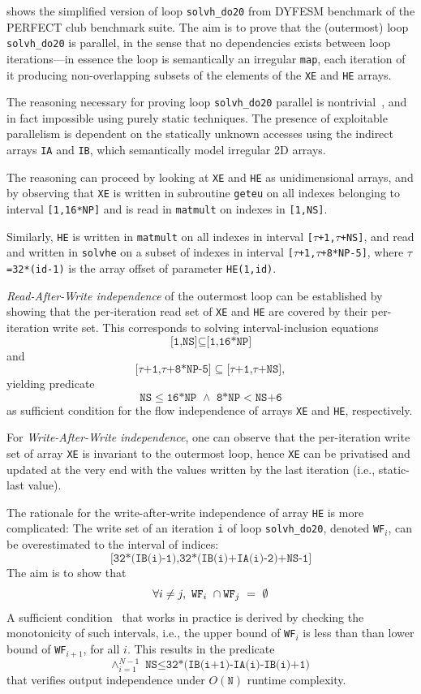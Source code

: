  shows the simplified version of loop
\texttt{solvh\_do20} from DYFESM benchmark of the PERFECT club
benchmark suite.
%
The aim is to prove that the (outermost) loop \texttt{solvh\_do20} is
parallel, in the sense that no dependencies exists between loop
iterations---in essence the loop is semantically an irregular
\texttt{map}, each iteration of it producing non-overlapping subsets
of the elements of the \texttt{XE} and \texttt{HE} arrays.

The reasoning necessary for proving loop \texttt{solvh\_do20} parallel
is nontrivial~\cite{CosPLDI}, and in fact impossible using purely
static techniques.  The presence of exploitable parallelism is
dependent on the statically unknown accesses using the indirect arrays
\texttt{IA} and \texttt{IB}, which semantically model irregular 2D
arrays.

The reasoning can proceed by looking at \texttt{XE} and \texttt{HE} as
unidimensional arrays, and by observing that \texttt{XE} is written in
subroutine \texttt{geteu} on all indexes belonging to interval
\texttt{[1,16*NP]} and is read in \texttt{matmult} on indexes in
\texttt{[1,NS]}.

Similarly, \texttt{HE} is written in \texttt{matmult} on all indexes in interval
\texttt{[$\tau$+1,$\tau$+NS]}, and read and written in \texttt{solvhe} on a subset
of indexes in interval \texttt{[$\tau$+1,$\tau$+8*NP-5]}, where
$\tau$\texttt{=32*(id-1)} is the array offset of parameter \texttt{HE(1,id)}.

\textit{Read-After-Write independence} of the outermost loop can be
established by showing that the per-iteration read set of \texttt{XE}
and \texttt{HE} are covered by their per-iteration write set. This
corresponds to solving interval-inclusion equations
\[
  \texttt{[1,NS]$\subseteq$[1,16*NP]}
\]
and
\[
  \texttt{[$\tau$+1,$\tau$+8*NP-5]$\subseteq$[$\tau$+1,$\tau$+NS]},
\]
yielding predicate
\[
  \texttt{NS$\leq$16*NP $\wedge$ 8*NP$<$NS+6}
\]
as sufficient condition for the flow independence of arrays
\texttt{XE} and \texttt{HE}, respectively.

For \textit{Write-After-Write independence}, one can observe that the
per-iteration write set of array \texttt{XE} is invariant to the
outermost loop, hence \texttt{XE} can be privatised and updated at the
very end with the values written by the last iteration (i.e.,
static-last value).

The rationale for the write-after-write independence of array
\texttt{HE} is more complicated: The write set of an iteration
\texttt{i} of loop \texttt{solvh\_do20},
denoted \texttt{WF$_i$}, can be overestimated to the interval of indices:
\[
  \texttt{[32*(IB(i)-1),32*(IB(i)+IA(i)-2)+NS-1]}
  \]
  The aim is to show that
  \[
    \forall i \neq j, \ \mbox{\texttt{WF}}_i \ \cap
    \mbox{\texttt{WF}}_j \ = \ \emptyset
\]
A sufficient condition~\cite{OanceaMon} that works in practice is
derived by checking the monotonicity of such intervals, i.e., the
upper bound of \texttt{WF$_i$} is less than than lower bound of
\texttt{WF$_{i+1}$}, for all $i$.
This results in the predicate
\[
  \wedge_{i=1}^{N-1}\texttt{NS$\leq$32*(IB(i+1)-IA(i)-IB(i)+1)}
\]
that verifies output independence under $O(\texttt{N})$ runtime
complexity.

